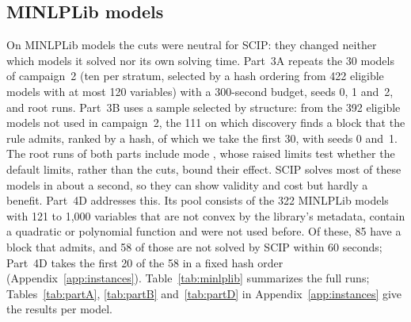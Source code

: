 \subsection{MINLPLib models}\label{sec:minlplib}

On MINLPLib models the cuts were neutral for SCIP: they changed neither which
models it solved nor its own solving time. Part~3A repeats the 30 models of campaign~2 (ten per stratum, selected by a
hash ordering from 422 eligible models with at most 120 variables) with a
300-second budget, seeds 0, 1 and~2, and root runs. Part~3B uses a sample
selected by structure: from the 392 eligible models not used in campaign~2,
the 111 on which discovery finds a block that the  rule admits,
ranked by a hash, of which we take the first 30, with seeds 0 and~1. The root
runs of both parts include mode , whose raised limits test
whether the default limits, rather than the cuts, bound their effect. SCIP
solves most of these models in about a second, so they can show validity and
cost but hardly a benefit. Part~4D addresses this. Its pool consists of the
322 MINLPLib models with 121 to 1{,}000 variables that are not convex by the
library's metadata, contain a quadratic or polynomial function and were not
used before. Of these, 85 have a block that  admits, and 58 of those
are not solved by SCIP within 60 seconds; Part~4D takes the first 20 of the 58
in a fixed hash order (Appendix~\ref{app:instances}). Table~\ref{tab:minlplib} summarizes the full
runs; Tables~\ref{tab:partA}, \ref{tab:partB} and~\ref{tab:partD} in
Appendix~\ref{app:instances} give the results per model.

